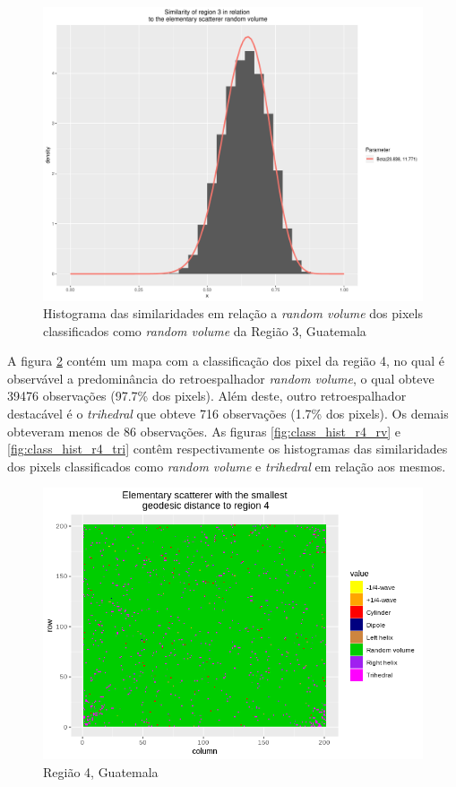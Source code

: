 \documentclass[12pt]{article}
\begin{document}
\begin{figure}[!h]
    \centering   
    \includegraphics[width = 0.8\linewidth]{../../Images/Report_18_12_20/Classifier_Geo_Dist/Histograms/Guate/region3_rv_sm_filter.pdf}
    \caption{Histograma das similaridades em relação a \textit{random volume} dos pixels classificados como \textit{random volume} da Região 3, Guatemala}
    \label{fig:class_hist_r3_rv}
\end{figure}

A figura \ref{fig:class_map_r4} contém um mapa com a classificação dos pixel da região 4, no qual é observável a predominância do retroespalhador \textit{random volume}, o qual obteve 39476 observações (97.7\% dos pixels). Além deste, outro retroespalhador destacável é o \textit{trihedral} que obteve 716 observações (1.7\% dos pixels). Os demais obteveram menos de 86 observações. As figuras \ref{fig:class_hist_r4_rv} e \ref{fig:class_hist_r4_tri} contêm respectivamente os histogramas das similaridades dos pixels classificados como \textit{random volume} e \textit{trihedral} em relação aos mesmos.

\begin{figure}[!h]
    \centering    
    \includegraphics[width = 0.8\linewidth]{../../Images/Report_18_12_20/Classifier_Geo_Dist/Class_Map/Guate/region4_predomain.png}
    \caption{Região 4, Guatemala}
    \label{fig:class_map_r4}
\end{figure}
\end{document}
